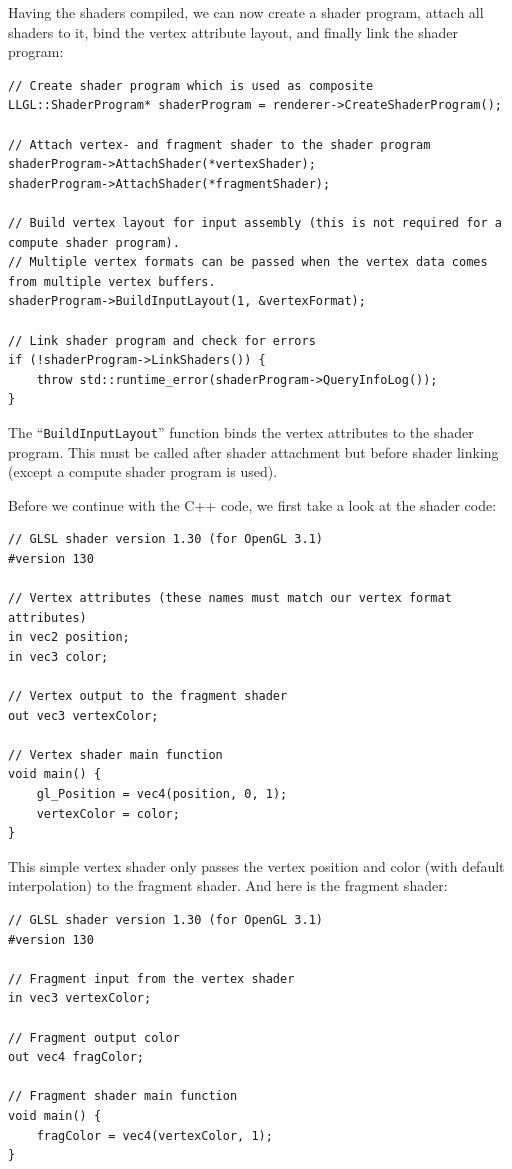 \documentclass{article}
\begin{document}
Having the shaders compiled, we can now create a shader program, attach all shaders to it,
bind the vertex attribute layout, and finally link the shader program:
\begin{lstlisting}
// Create shader program which is used as composite
LLGL::ShaderProgram* shaderProgram = renderer->CreateShaderProgram();

// Attach vertex- and fragment shader to the shader program
shaderProgram->AttachShader(*vertexShader);
shaderProgram->AttachShader(*fragmentShader);

// Build vertex layout for input assembly (this is not required for a compute shader program).
// Multiple vertex formats can be passed when the vertex data comes from multiple vertex buffers.
shaderProgram->BuildInputLayout(1, &vertexFormat);

// Link shader program and check for errors
if (!shaderProgram->LinkShaders()) {
    throw std::runtime_error(shaderProgram->QueryInfoLog());
}
\end{lstlisting}
The ``\texttt{BuildInputLayout}'' function binds the vertex attributes to the shader program.
This must be called after shader attachment but before shader linking (except a compute shader program is used).

Before we continue with the C++ code, we first take a look at the shader code:
\begin{lstlisting}[title={\texttt{vertex.glsl}}]
// GLSL shader version 1.30 (for OpenGL 3.1)
#version 130

// Vertex attributes (these names must match our vertex format attributes)
in vec2 position;
in vec3 color;

// Vertex output to the fragment shader
out vec3 vertexColor;

// Vertex shader main function
void main() {
    gl_Position = vec4(position, 0, 1);
    vertexColor = color;
}
\end{lstlisting}
This simple vertex shader only passes the vertex position and color (with default interpolation) to the fragment shader.
And here is the fragment shader:
\begin{lstlisting}[title={\texttt{fragment.glsl}}]
// GLSL shader version 1.30 (for OpenGL 3.1)
#version 130

// Fragment input from the vertex shader
in vec3 vertexColor;

// Fragment output color
out vec4 fragColor;

// Fragment shader main function
void main() {
    fragColor = vec4(vertexColor, 1);
}
\end{lstlisting}
\end{document}
